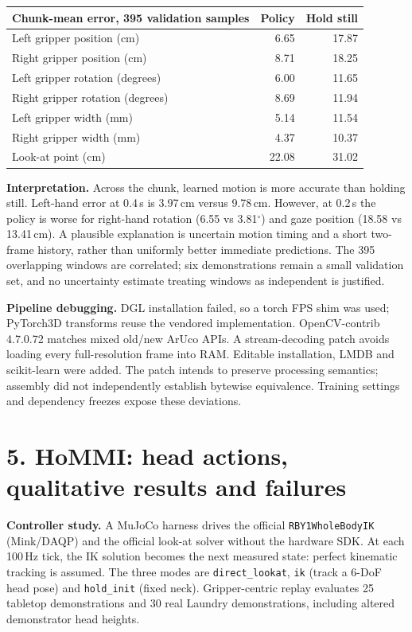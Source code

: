 \documentclass[10pt,a4paper]{article}
\newcommand{\artifact}[1]{\texttt{\small #1}}
\begin{document}
\begin{center}\small
\begin{tabular}{lrr}\toprule
Chunk-mean error, 395 validation samples & Policy & Hold still\\\midrule
Left gripper position (cm) & 6.65 & 17.87\\
Right gripper position (cm) & 8.71 & 18.25\\
Left gripper rotation (degrees) & 6.00 & 11.65\\
Right gripper rotation (degrees) & 8.69 & 11.94\\
Left gripper width (mm) & 5.14 & 11.54\\
Right gripper width (mm) & 4.37 & 10.37\\
Look-at point (cm) & 22.08 & 31.02\\\bottomrule
\end{tabular}\end{center}
\textbf{Interpretation.} Across the chunk, learned motion is more accurate than holding still. Left-hand error at 0.4\,s is 3.97\,cm versus 9.78\,cm. However, at 0.2\,s the policy is worse for right-hand rotation (6.55 vs 3.81$^\circ$) and gaze position (18.58 vs 13.41\,cm). A plausible explanation is uncertain motion timing and a short two-frame history, rather than uniformly better immediate predictions. The 395 overlapping windows are correlated; six demonstrations remain a small validation set, and no uncertainty estimate treating windows as independent is justified.

\textbf{Pipeline debugging.} DGL installation failed, so a torch FPS shim was used; PyTorch3D transforms reuse the vendored implementation. OpenCV-contrib 4.7.0.72 matches mixed old/new ArUco APIs. A stream-decoding patch avoids loading every full-resolution frame into RAM. Editable installation, LMDB and scikit-learn were added. The patch intends to preserve processing semantics; assembly did not independently establish bytewise equivalence. Training settings and dependency freezes expose these deviations.

\clearpage
\section*{5. HoMMI: head actions, qualitative results and failures}
\textbf{Controller study.} A MuJoCo harness drives the official \artifact{RBY1WholeBodyIK} (Mink/DAQP) and the official look-at solver without the hardware SDK. At each 100\,Hz tick, the IK solution becomes the next measured state: perfect kinematic tracking is assumed. The three modes are \artifact{direct\_lookat}, \artifact{ik} (track a 6-DoF head pose) and \artifact{hold\_init} (fixed neck). Gripper-centric replay evaluates 25 tabletop demonstrations and 30 real Laundry demonstrations, including altered demonstrator head heights.
\end{document}
